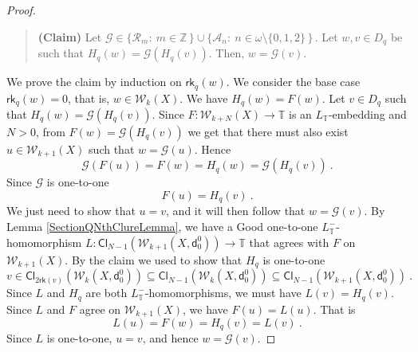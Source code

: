 \documentclass[10pt,a4paper, openany,  oldfontcommands]{memoir}
\newtheorem{open problem} [theorem] {Open Problem}
\newtheorem{open question} [theorem] {Open Question}
\begin{document}
\begin{proof}
       \begin{quote} {\bf (Claim)} \;\;\;\;\;\;    
       Let   $  \mathcal{G}  \in  \lbrace  \mathcal{R}_m  :   \   m  \in  \mathbb{Z}  \,   \rbrace   \cup  
       \lbrace  \mathcal{A}_n  :   \     n   \in  \omega  \setminus  \lbrace 0, 1,  2  \rbrace    \,   \rbrace      \,      $.
     Let   $   w,  v   \in D_q $  be such that  $  H_q (w)  = \mathcal{G}  \left(    H_q (v)   \right)   $.
 Then,  $  w  =  \mathcal{G}  \left(    v  \right)     $.
 \end{quote}  
  
  We prove the claim by induction on  $  \mathsf{rk}_q  \left(  w  \right)  $. 
  We consider the base  case    $   \mathsf{rk}_q  \left(  w  \right)    = 0  $,  that is, 
  $  w  \in  \mathcal{W}_k  \left(  X   \right)   $. 
  We have  $  H_q (w)  =  F(w)  $. 
  Let    $  v  \in D_q  $  such that   $  H_q (w)  = \mathcal{G}  \left(    H_q (v)   \right)   $. 
  Since  $F :  \mathcal{W}_{k+N }  \left(  X   \right)     \to  \mathbb{T}  $  is an  $ L_{  \mathbb{T}  }  $-embedding
  and  $  N   >  0  $,  
  from  $   F(w)  = \mathcal{G}  \left(    H_q (v)   \right)   $  we get that   there must also exist  
  $  u  \in    \mathcal{W}_{k+1 }  \left(  X   \right)   $  such that  
  $  w  =   \mathcal{G}  \left(    u   \right)   $. 
  Hence 
  \[
 \mathcal{G}  \left(   F (u)   \right)   =  F(w)   =   H_q (w)  = \mathcal{G}  \left(    H_q (v)   \right) 
 \      .
  \]
  Since  $   \mathcal{G}   $  is one-to-one
\[
 F(u)  =  H_q (v)   
 \        .
 \]
    We just need to show that  $  u  =  v  $, and it will then follow that   $  w  =  \mathcal{G}  \left(    v  \right)     $.
    By Lemma     \ref{SectionQNthClureLemma},  
    we have a  \textsf{Good} one-to-one  $  L_{  \mathbb{T} }^-$-homomorphism 
    $  L  :   \mathsf{Cl}_{  N-1 }   \left(    \mathcal{W}_{k+1}   \left(  X   ,  \mathsf{d}^0_0  \right)      \right)      \to  \mathbb{T}  $  
    that agrees with $F$ on  $   \mathcal{W}_{k+1}   \left(  X   \right)    $.
    By    the  claim we used to show that  $  H_q  $  is one-to-one
    \[
    v  \in    \mathsf{Cl}_{  2  \mathsf{rk} \left(  v \right)  }   \left(    \mathcal{W}_k  \left(  X   ,  \mathsf{d}^0_0  \right)      \right)   
    \subseteq  
    \mathsf{Cl}_{N-1}  \left(    \mathcal{W}_k  \left(  X   ,  \mathsf{d}^0_0  \right)      \right)   
    \subseteq    \mathsf{Cl}_{  N-1 }   \left(    \mathcal{W}_{k+1}   \left(  X   ,  \mathsf{d}^0_0  \right)      \right)   
    \      .
    \]
Since  $  L$  and  $  H_q  $  are both       $  L_{  \mathbb{T} }^-$-homomorphisms, 
we must have  $  L(v)  = H_q  (v)  $. 
Since  $L$ and  $F$ agree on   $   \mathcal{W}_{k+1}   \left(  X   \right)    $, we have  $ F(u)  =  L(u)  $. 
That is 
\[
L(u)  =  F(w)  =  H_q ( v)  =  L(v) 
\   .
\]
Since  $L$ is one-to-one,  $  u =  v  $, and hence  $  w  =  \mathcal{G}  \left(    v  \right)     $.


\end{proof}
\end{document}
